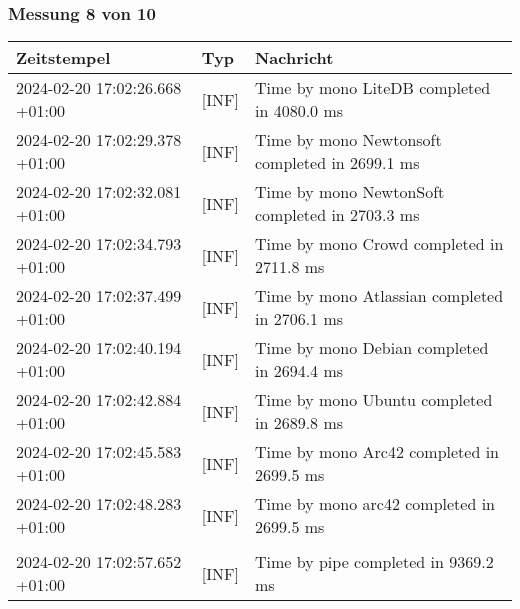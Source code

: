     \subsubsection{Messung 8 von 10} \label{subsubsec:LiteDbWenigerPaketeAlsDb8von10}
        {
            {\small
                \begin{tabularx}{\textwidth}{|l|l|X|}
                    \hline
                    \textbf{Zeitstempel} & \textbf{Typ} & \textbf{Nachricht} \\
                    \hline
                    \endhead
                    2024-02-20 17:02:26.668 +01:00 & [INF] & Time by mono LiteDB completed in 4080.0 ms \\
                    2024-02-20 17:02:29.378 +01:00 & [INF] & Time by mono Newtonsoft completed in 2699.1 ms \\
                    2024-02-20 17:02:32.081 +01:00 & [INF] & Time by mono NewtonSoft completed in 2703.3 ms \\
                    2024-02-20 17:02:34.793 +01:00 & [INF] & Time by mono Crowd completed in 2711.8 ms \\
                    2024-02-20 17:02:37.499 +01:00 & [INF] & Time by mono Atlassian completed in 2706.1 ms \\
                    2024-02-20 17:02:40.194 +01:00 & [INF] & Time by mono Debian completed in 2694.4 ms \\
                    2024-02-20 17:02:42.884 +01:00 & [INF] & Time by mono Ubuntu completed in 2689.8 ms \\
                    2024-02-20 17:02:45.583 +01:00 & [INF] & Time by mono Arc42 completed in 2699.5 ms \\
                    2024-02-20 17:02:48.283 +01:00 & [INF] & Time by mono arc42 completed in 2699.5 ms \\
                    & & \\
                    2024-02-20 17:02:57.652 +01:00 & [INF] & Time by pipe completed in 9369.2 ms \\
                    \hline
                \end{tabularx}
            }
        }

